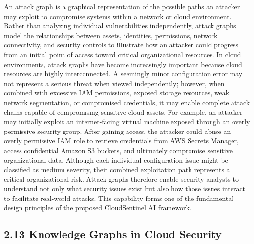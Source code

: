 An attack graph is a graphical representation \cite{phillips1998graph,sheyner2002automated,jha2002formal} of the possible paths an attacker may exploit to compromise systems within a network or cloud environment. Rather than analyzing individual vulnerabilities independently, attack graphs model the relationships between assets, identities, permissions, network connectivity, and security controls to illustrate how an attacker could progress from an initial point of access toward critical organizational resources. In cloud environments, attack graphs have become increasingly important because cloud resources are highly interconnected. A seemingly minor configuration error may not represent a serious threat when viewed independently; however, when combined with excessive IAM permissions, exposed storage resources, weak network segmentation, or compromised credentials, it may enable complete attack chains capable of compromising sensitive cloud assets. For example, an attacker may initially exploit an internet-facing virtual machine exposed through an overly permissive security group. After gaining access, the attacker could abuse an overly permissive IAM role to retrieve credentials from AWS Secrets Manager, access confidential Amazon S3 buckets, and ultimately compromise sensitive organizational data. Although each individual configuration issue might be classified as medium severity, their combined exploitation path represents a critical organizational risk. Attack graphs therefore enable security analysts to understand not only what security issues exist but also how those issues interact to facilitate real-world attacks. This capability forms one of the fundamental design principles of the proposed CloudSentinel AI framework.

\subsection{2.13 Knowledge Graphs in Cloud Security}

